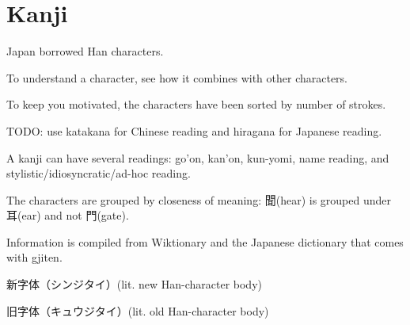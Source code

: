 \chapter{Kanji}

Japan borrowed Han characters.

To understand a character, see how it combines with other characters.

To keep you motivated, the characters have been sorted by number of strokes.

TODO: use katakana for Chinese reading and hiragana for Japanese reading.

A kanji can have several readings:
go'on, kan'on, kun-yomi, name reading, and stylistic/idiosyncratic/ad-hoc reading.

The characters are grouped by closeness of meaning:
聞(hear) is grouped under 耳(ear) and not 門(gate).

Information is compiled from Wiktionary
and the Japanese dictionary that comes with gjiten.

新字体（シンジタイ）(lit. new Han-character body)

旧字体（キュウジタイ）(lit. old Han-character body)
